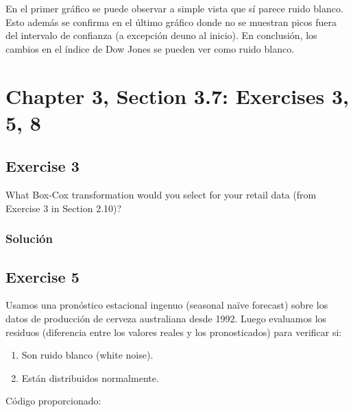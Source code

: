 \documentclass[12pt]{article}\usepackage[]{graphicx}\usepackage[]{xcolor}
\begin{document}
En el primer gráfico se puede observar a simple vista que sí parece ruido blanco. Esto además se confirma en el último gráfico donde no se muestran picos fuera del intervalo de confianza (a excepción deuno al inicio). En conclusión, los cambios en el índice de Dow Jones se pueden ver como ruido blanco.



\section{Chapter 3, Section 3.7: Exercises 3, 5, 8}


\subsection{Exercise 3}

What Box-Cox transformation would you select for your retail data (from Exercise 3 in Section 2.10)?

\subsubsection{Solución}





\subsection{Exercise 5}

Usamos una pronóstico estacional ingenuo (seasonal naïve forecast) sobre los datos de producción de cerveza australiana desde 1992. Luego evaluamos los residuos (diferencia entre los valores reales y los pronosticados) para verificar si:

\begin{enumerate}
  \item Son ruido blanco (white noise).
  \item Están distribuidos normalmente.
\end{enumerate}


Código proporcionado:
\end{document}
